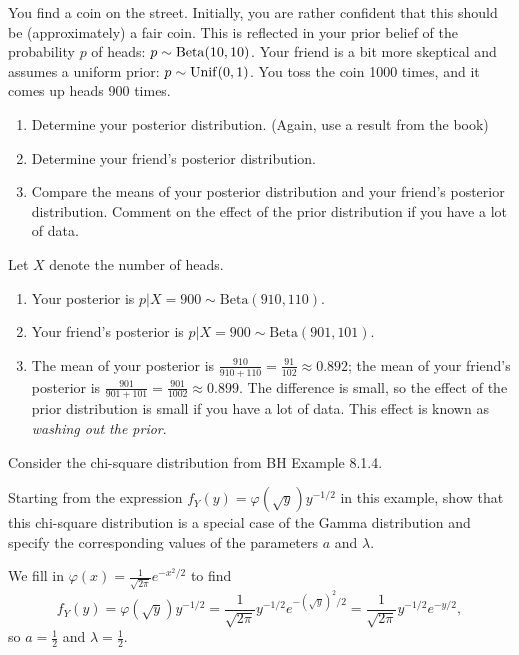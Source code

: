 \documentclass[assignments]{subfiles}
\begin{document}
\begin{exercise}
You find a coin on the street. Initially, you are rather confident that this should be (approximately) a fair coin. This is reflected in your prior belief of the probability $p$ of heads: $p \sim \mathrm{Beta}(10,10)$. Your friend is a bit more skeptical and assumes a uniform prior: $p \sim \mathrm{Unif}(0,1)$.  You toss the coin 1000 times, and it comes up heads 900 times.

\begin{enumerate}
\item Determine your posterior distribution. (Again, use  a result from the book)
\item Determine your friend's posterior distribution.
\item Compare the means of your posterior distribution and your friend's posterior distribution. Comment on the effect of the prior distribution if you have a lot of data.
\end{enumerate}

\begin{solution}
Let $X$ denote the number of heads.
\begin{enumerate}
    \item Your posterior is $p|X=900 \sim \text{Beta}(910,110)$.
    \item Your friend's posterior is $p|X=900 \sim \text{Beta}(901,101)$.
    \item The mean of your posterior is $\frac{910}{910+110} = \frac{91}{102} \approx 0.892$; the mean of your friend's posterior is  $\frac{901}{901+101} = \frac{901}{1002} \approx 0.899$. The difference is small, so the  effect of the prior distribution is small if you have a lot of data. This effect is known as \textit{washing out the prior}.
\end{enumerate}
\end{solution}

\end{exercise}

\begin{exercise}
Consider the chi-square distribution from BH Example 8.1.4.

Starting from the expression $f_Y(y) = \varphi \left(\sqrt{y}\right) y^{-1/2}$ in this example, show that this  chi-square distribution is a special case of the Gamma distribution and specify the corresponding values of the parameters $a$ and $\lambda$.

\begin{solution} We fill in $\varphi(x) = \frac{1}{\sqrt{2\pi}} e^{-x^2/2}$ to find
\begin{equation*} f_Y(y) = \varphi \left(\sqrt{y}\right) y^{-1/2} = \frac{1}{\sqrt{2\pi}} y^{-1/2} e^{-(\sqrt{y})^2/2} = \frac{1}{\sqrt{2\pi}} y^{-1/2} e^{-y/2}, \end{equation*} so $a = \tfrac12$ and $\lambda = \tfrac12$.
\end{solution}
\end{exercise}
\end{document}
